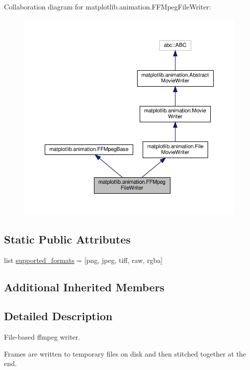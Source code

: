 Collaboration diagram for matplotlib.\+animation.\+F\+F\+Mpeg\+File\+Writer\+:
\nopagebreak
\begin{figure}[H]
\begin{center}
\leavevmode
\includegraphics[width=350pt]{classmatplotlib_1_1animation_1_1FFMpegFileWriter__coll__graph}
\end{center}
\end{figure}
\subsection*{Static Public Attributes}
\begin{DoxyCompactItemize}
\item 
list \hyperlink{classmatplotlib_1_1animation_1_1FFMpegFileWriter_a03fdb1c87983f375fc5b18f3acf3dd62}{supported\+\_\+formats} = \mbox{[}\textquotesingle{}png\textquotesingle{}, \textquotesingle{}jpeg\textquotesingle{}, \textquotesingle{}tiff\textquotesingle{}, \textquotesingle{}raw\textquotesingle{}, \textquotesingle{}rgba\textquotesingle{}\mbox{]}
\end{DoxyCompactItemize}
\subsection*{Additional Inherited Members}


\subsection{Detailed Description}
\begin{DoxyVerb}File-based ffmpeg writer.

Frames are written to temporary files on disk and then stitched
together at the end.
\end{DoxyVerb}
 

